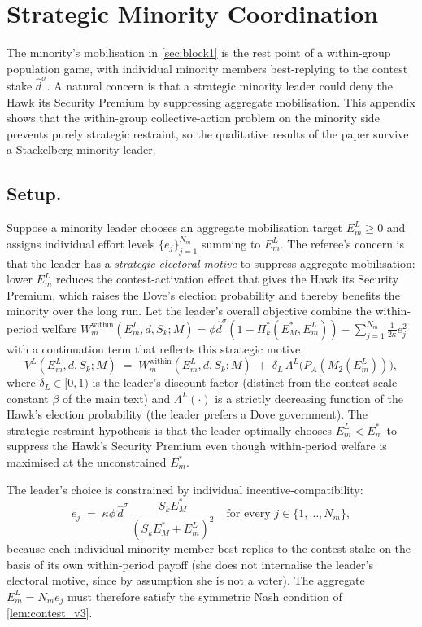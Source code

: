 \documentclass[11pt,twoside]{extarticle}
\begin{document}
\section{Strategic Minority Coordination}\label{oa:strategic_minority}

The minority's mobilisation in \autoref{sec:block1} is the rest point of a within-group population game, with individual minority members best-replying to the contest stake $\hat d^\sigma$. A natural concern is that a strategic minority leader could deny the Hawk its Security Premium by suppressing aggregate mobilisation. This appendix shows that the within-group collective-action problem on the minority side prevents purely strategic restraint, so the qualitative results of the paper survive a Stackelberg minority leader.

\subsection*{Setup.} Suppose a minority leader chooses an aggregate mobilisation target $E_m^L\ge 0$ and assigns individual effort levels $\{e_j\}_{j=1}^{N_m}$ summing to $E_m^L$. The referee's concern is that the leader has a \emph{strategic-electoral motive} to suppress aggregate mobilisation: lower $E_m^L$ reduces the contest-activation effect that gives the Hawk its Security Premium, which raises the Dove's election probability and thereby benefits the minority over the long run. Let the leader's overall objective combine the within-period welfare $W_m^{\text{within}}(E_m^L,d,S_k;M)=\phi\hat d^\sigma(1-\Pi_k^*(E_M^*,E_m^L))-\sum_{j=1}^{N_m}\frac{1}{2\kappa}e_j^2$ with a continuation term that reflects this strategic motive,
\begin{equation}\label{eq:leader_objective}
    V^L(E_m^L,d,S_k;M)\;=\;W_m^{\text{within}}(E_m^L,d,S_k;M)\;+\;\delta_L\,\Lambda^L\big(P_A(M_2(E_m^L))\big),
\end{equation}
where $\delta_L\in[0,1)$ is the leader's discount factor (distinct from the contest scale constant $\beta$ of the main text) and $\Lambda^L(\cdot)$ is a strictly decreasing function of the Hawk's election probability (the leader prefers a Dove government). The strategic-restraint hypothesis is that the leader optimally chooses $E_m^L<E_m^*$ to suppress the Hawk's Security Premium even though within-period welfare is maximised at the unconstrained $E_m^*$.

The leader's choice is constrained by individual incentive-compatibility:
\begin{equation}\label{eq:IC}
    e_j\;=\;\kappa\phi\,\hat d^\sigma\,\frac{S_kE_M^*}{(S_kE_M^*+E_m^L)^2}\quad\text{for every }j\in\{1,\dots,N_m\},
\end{equation}
because each individual minority member best-replies to the contest stake on the basis of its own within-period payoff (she does not internalise the leader's electoral motive, since by assumption she is not a voter). The aggregate $E_m^L=N_m e_j$ must therefore satisfy the symmetric Nash condition of \autoref{lem:contest_v3}.
\end{document}

